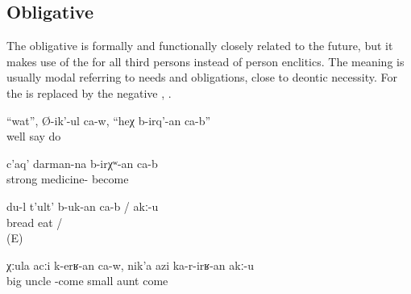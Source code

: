 
\subsection{Obligative}
\label{ssec:Obligative}

The obligative is formally and functionally closely related to the future, but it makes use of the  for all third persons instead of person enclitics. The meaning is usually modal referring to needs and obligations, close to deontic necessity. For  the   is replaced by the negative   , .
%
\begin{exe}
	\ex	\label{ex:Well, he says, this needs to be done}
	\gll	``wat'',	Ø-ik'-ul	ca-w,	``heχ	b-irq'-an	ca-b''	\\
		well	say			do	\\
	\glt	{}


	\ex	\label{ex:It must be a strong medicine}
	\gll	c'aq'	darman-na	b-irχʷ-an	ca-b\\
		strong		medicine-	become	\\
	\glt	{}


	\ex	\label{ex:I have / do not have to eat bread}
	\gll	du-l t'ult' b-uk-an	ca-b	/	akː-u\\
			bread	eat	 /	\\
	\glt	{} (E)
	
	\ex	\label{ex:The elder uncle has to go; the younger aunt should not go}
	\gll	χːula	acːi	k-erʁ-an	ca-w,	nik'a	azi	ka-r-irʁ-an	akː-u\\
		big	uncle	-come		small	aunt	come	\\
	\glt	{}
\end{exe}



